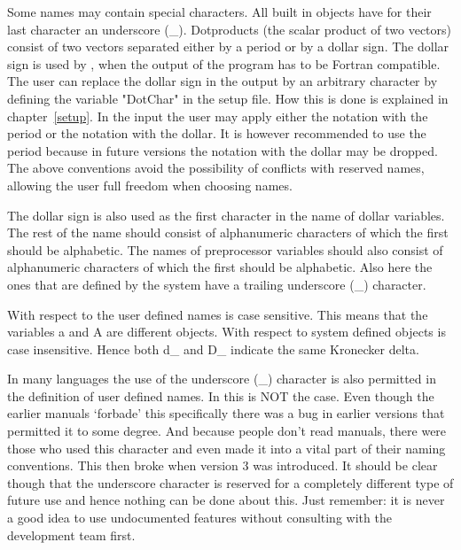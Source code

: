Some names may contain special characters. All built in objects have for 
their last character an underscore (\_). 
Dotproducts (the scalar product of two vectors) consist 
of two vectors separated either by a period or by a dollar sign. The dollar 
sign is used by {\FORM}, when the output of the program has to be 
Fortran compatible. The user can replace the dollar sign in 
the output by an arbitrary character by defining the variable 
"DotChar" in the setup file. How this is 
done is explained in chapter~\ref{setup}. In the input the user may apply 
either the notation with the period or the notation with the dollar. It is 
however recommended to use the period because in future 
versions the notation with the dollar may be dropped.  The above 
conventions avoid the possibility of conflicts with reserved names, 
allowing the user full freedom when choosing names. 

The dollar sign is also used as the first character in the name of dollar 
variables. The rest of the name should consist of 
alphanumeric characters of which the first should be alphabetic. The names 
of preprocessor variables should also consist 
of alphanumeric characters of which the first should be alphabetic. Also 
here the ones that are defined by the system have a trailing 
underscore (\_) character.

With respect to the user defined names {\FORM} is case sensitive. This 
means that the variables a and A are different objects. With respect to 
system defined objects {\FORM} is case insensitive. Hence both d\_ and D\_ 
indicate the same Kronecker delta.

In many languages the use of the underscore (\_) 
character is also permitted in the definition of user defined names. In 
{\FORM} this is NOT the case. Even though the earlier manuals `forbade' 
this specifically there was a bug in earlier versions that permitted it to 
some degree. And because people don't read manuals, there were those who 
used this character and even made it into a vital part of their naming 
conventions. This then broke when version 3 was introduced. It should be 
clear though that the underscore character is reserved for a completely 
different type of future use and hence nothing can be done about this. Just 
remember: it is never a good idea to use undocumented features without 
consulting with the development team first.

